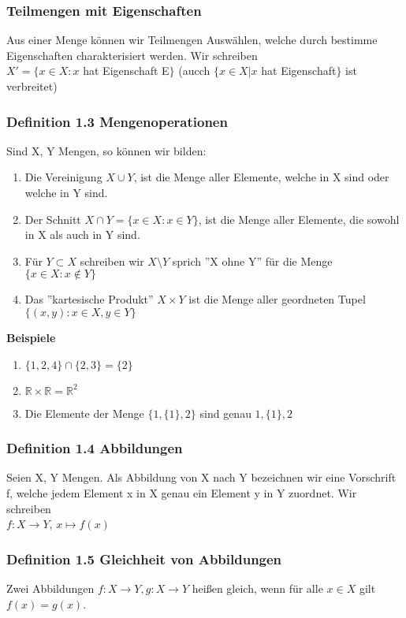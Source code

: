 \documentclass{scrartcl}
\newcommand{\R}{\mathbb{R}}
\begin{document}
\subsubsection{Teilmengen mit Eigenschaften}
Aus einer Menge k\"onnen wir Teilmengen Ausw\"ahlen, welche durch bestimme Eigenschaften charakterisiert werden. Wir schreiben\\
\(X' = \{x \in X : x \) hat Eigenschaft E\(\}\) (aucch \(\{x \in X | x \) hat Eigenschaft\(\}\) ist verbreitet)

\subsubsection{Definition 1.3 Mengenoperationen }
Sind X, Y Mengen, so k\"onnen wir bilden:
\begin{enumerate}
\item{Die Vereinigung \(X \cup Y\), ist die Menge aller Elemente, welche in X sind oder welche in Y sind.}
\item{Der Schnitt \(X \cap Y = \{x \in X : x \in Y\}\), ist die Menge aller Elemente, die sowohl in X als auch in Y sind.}
\item{F\"ur \(Y \subset X\) schreiben wir \(X \setminus Y\) sprich ''X ohne Y'' f\"ur die Menge \(\{x \in X : x \not\in Y\}\)}
\item{Das ''kartesische Produkt'' \(X \times Y\) ist die Menge aller geordneten Tupel \(\{(x, y) : x\in X, y\in Y\}\) }
\end{enumerate}
\textbf{Beispiele}
\begin{enumerate}
\item{\(\{1, 2, 4\} \cap \{2, 3\} = \{2\}\)}
\item{\(\R \times \R = \R^2\)}
\item{Die Elemente der Menge \(\{1, \{1\}, 2\}\) sind genau \(1, \{1\}, 2\) }
\end{enumerate}

\subsubsection{Definition 1.4 Abbildungen}
Seien X, Y Mengen. Als Abbildung von X nach Y bezeichnen wir eine Vorschrift f, welche jedem Element x in X genau ein Element y in Y zuordnet. Wir schreiben\\
\(f : X \rightarrow Y\), \(x \mapsto f(x)\)

\subsubsection{Definition 1.5 Gleichheit von Abbildungen}
Zwei Abbildungen \(f : X \rightarrow Y, g : X \rightarrow Y\) hei\ss{}en gleich, wenn f\"ur alle \(x \in X\) gilt \(f(x) = g(x)\).
\end{document}
